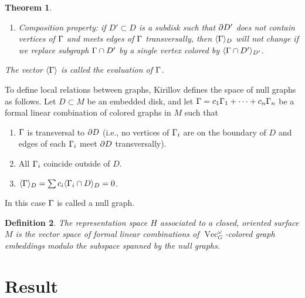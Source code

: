 \documentclass{amsart}
\newtheorem{thm}{Theorem}[section]
\newtheorem{prop}[thm]{Proposition}
\newtheorem{defn}[thm]{Definition}
\DeclareMathOperator{\MCG}{MCG}
\DeclareMathOperator{\Vect}{Vec}
\DeclareMathOperator{\Homeo}{Homeo}
\begin{document}
\begin{thm}
\begin{enumerate}
    \item Composition property: if $D'\subset D$ is a subdisk such
      that $\partial D'$ does not contain vertices of $\Gamma$ and meets edges of
      $\Gamma$ transversally, then   $\langle\Gamma\rangle_D$ will not change if we replace
      subgraph $\Gamma\cap D'$ by a single vertex colored by
      $\langle\Gamma\cap D'\rangle_{D'}$.

  \end{enumerate}
The vector $\langle\Gamma\rangle$ is called the {\em evaluation} of $\Gamma$.
\end{thm}

To define local relations between graphs, Kirillov defines the space of
null graphs as follows.  Let $D\subset M$ be an embedded disk, and let
$\Gamma=c_1\Gamma_1+\dots+c_n\Gamma_n$ be a formal linear
combination of colored graphs in $M$ such that
\begin{enumerate}
  \item $\Gamma$ is transversal to $\partial D$ (i.e., no vertices of $\Gamma_i$ 
      are on the boundary of $D$ and edges of each $\Gamma_i$ meet 
      $\partial D$ transversally).
  \item All $\Gamma_i$ coincide outside of $D$.
  \item $\langle\Gamma\rangle_D=\sum c_i\langle\Gamma_i\cap D\rangle_D=0$.
\end{enumerate}
In this case $\Gamma$ is called a null graph. 

\begin{defn}
The representation space $H$ associated to a closed, oriented surface $M$ is the vector space of formal linear combinations of $\Vect_G^\omega$-colored graph embeddings modulo the subspace spanned by the null graphs.
\end{defn}

\section{Result}

\end{document}
